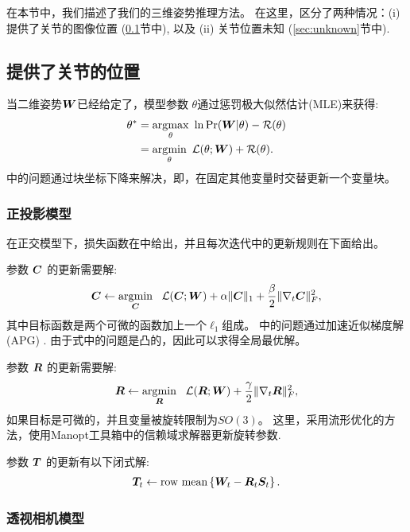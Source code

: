 
在本节中，我们描述了我们的三维姿势推理方法。 在这里，区分了两种情况：(i) 提供了关节的图像位置 (\ref{sec:known}节中), 以及
(ii) 关节位置未知 (\ref{sec:unknown}节中).

\subsection{提供了关节的位置}\label{sec:known}

当二维姿势${\bm{W}}$已经给定了，模型参数 $\theta$通过惩罚极大似然估计(MLE)来获得:
\begin{align}\label{eq:pmle} 
\theta^* &= \operatorname*{arg\!\max}_{\theta} ~ \ln\mbox{Pr}({\bm{W}}|\theta) - \mathcal{R}(\theta) \nonumber \\
& = \operatorname*{arg\!\min}_{\theta} ~ \mathcal{L}(\theta;{\bm{W}}) + \mathcal{R}(\theta).
\end{align}
  中的问题通过块坐标下降来解决，即，在固定其他变量时交替更新一个变量块。

\subsubsection{正投影模型}
 
在正交模型下，损失函数在中给出，并且每次迭代中的更新规则在下面给出。

参数 ${\bm{C}}$ 的更新需要解:
\begin{align}\label{eq:C-step}
{\bm{C}} \leftarrow \operatorname*{arg\!\min}_{{\bm{C}}} ~~ \mathcal{L}({\bm{C}};{\bm{W}}) + \alpha\|{\bm{C}}\|_1 + \frac{\beta}{2}\|\nabla_t{\bm{C}}\|_F^2,
\end{align}
其中目标函数是两个可微的函数加上一个$\ell_1$组成。
中的问题通过加速近似梯度解(APG) \cite{nesterov2007gradient}.
由于式中的问题是凸的，因此可以求得全局最优解。 

参数 ${\bm{R}}$ 的更新需要解:
\begin{align}\label{eq:R-step}
{\bm{R}} \leftarrow \operatorname*{arg\!\min}_{{\bm{R}}} ~~ \mathcal{L}({\bm{R}};{\bm{W}}) + \frac{\gamma}{2}\|\nabla_t{\bm{R}}\|_F^2,
\end{align}
如果目标是可微的，并且变量被旋转限制为$SO(3)$。 这里，采用流形优化的方法，使用Manopt工具箱中的信赖域求解器更新旋转参数\cite{boumal2014manopt}.

参数 ${\bm{T}}$ 的更新有以下闭式解:
\begin{align}\label{eq:T-step}
{\bm{T}}_t \leftarrow \mbox{row mean}\left\{{\bm{W}}_t - {\bm{R}}_t{\bm{S}}_t\right\}.
\end{align}

\subsubsection{透视相机模型}


